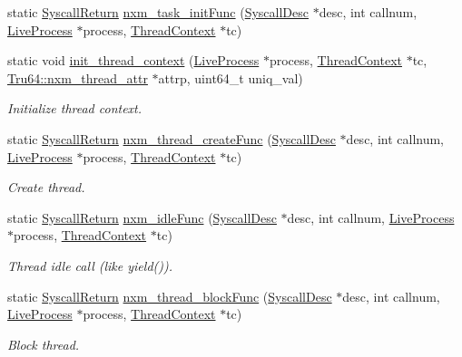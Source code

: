 \begin{DoxyCompactItemize}
static \hyperlink{classSyscallReturn}{SyscallReturn} \hyperlink{classTru64_a7393c42ceaadfe69e71c4cab0d059968}{nxm\_\-task\_\-initFunc} (\hyperlink{classSyscallDesc}{SyscallDesc} $\ast$desc, int callnum, \hyperlink{classLiveProcess}{LiveProcess} $\ast$process, \hyperlink{classThreadContext}{ThreadContext} $\ast$tc)
\item 
static void \hyperlink{classTru64_a83da5f99bb14ade814d1509f55d1db1b}{init\_\-thread\_\-context} (\hyperlink{classLiveProcess}{LiveProcess} $\ast$process, \hyperlink{classThreadContext}{ThreadContext} $\ast$tc, \hyperlink{structTru64_1_1nxm__thread__attr}{Tru64::nxm\_\-thread\_\-attr} $\ast$attrp, uint64\_\-t uniq\_\-val)
\begin{DoxyCompactList}\small\item\em Initialize thread context. \item\end{DoxyCompactList}\item 
static \hyperlink{classSyscallReturn}{SyscallReturn} \hyperlink{classTru64_a56167e2aed868ff95f0864b9075adab1}{nxm\_\-thread\_\-createFunc} (\hyperlink{classSyscallDesc}{SyscallDesc} $\ast$desc, int callnum, \hyperlink{classLiveProcess}{LiveProcess} $\ast$process, \hyperlink{classThreadContext}{ThreadContext} $\ast$tc)
\begin{DoxyCompactList}\small\item\em Create thread. \item\end{DoxyCompactList}\item 
static \hyperlink{classSyscallReturn}{SyscallReturn} \hyperlink{classTru64_a7d672681a6c03ce2f3d8e64b159d23d7}{nxm\_\-idleFunc} (\hyperlink{classSyscallDesc}{SyscallDesc} $\ast$desc, int callnum, \hyperlink{classLiveProcess}{LiveProcess} $\ast$process, \hyperlink{classThreadContext}{ThreadContext} $\ast$tc)
\begin{DoxyCompactList}\small\item\em Thread idle call (like yield()). \item\end{DoxyCompactList}\item 
static \hyperlink{classSyscallReturn}{SyscallReturn} \hyperlink{classTru64_a05e8a076d0c534c96b680a3661fc9003}{nxm\_\-thread\_\-blockFunc} (\hyperlink{classSyscallDesc}{SyscallDesc} $\ast$desc, int callnum, \hyperlink{classLiveProcess}{LiveProcess} $\ast$process, \hyperlink{classThreadContext}{ThreadContext} $\ast$tc)
\begin{DoxyCompactList}\small\item\em Block thread. \item\end{DoxyCompactList}\item 

\end{DoxyCompactItemize}
